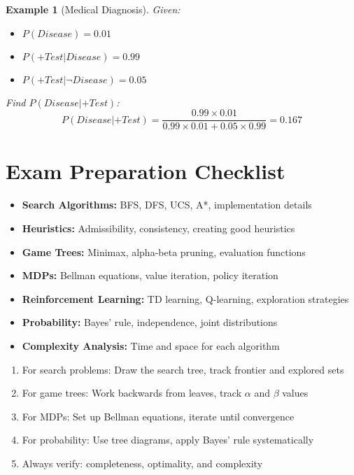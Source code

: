 \documentclass[11pt,letterpaper]{article}
\newtheorem{example}{Example}[section]
\begin{document}
\begin{example}[Medical Diagnosis]
Given:
\begin{itemize}
    \item $P(Disease) = 0.01$
    \item $P(+Test|Disease) = 0.99$
    \item $P(+Test|\neg Disease) = 0.05$
\end{itemize}
Find $P(Disease|+Test)$:
$$P(Disease|+Test) = \frac{0.99 \times 0.01}{0.99 \times 0.01 + 0.05 \times 0.99} = 0.167$$
\end{example}

\section{Exam Preparation Checklist}

\begin{tcolorbox}[colback=yellow!10!white,colframe=yellow!50!black,title=Essential Topics to Review]
\begin{itemize}[leftmargin=*]
    \item[\checkmark] \textbf{Search Algorithms:} BFS, DFS, UCS, A*, implementation details
    \item[\checkmark] \textbf{Heuristics:} Admissibility, consistency, creating good heuristics
    \item[\checkmark] \textbf{Game Trees:} Minimax, alpha-beta pruning, evaluation functions
    \item[\checkmark] \textbf{MDPs:} Bellman equations, value iteration, policy iteration
    \item[\checkmark] \textbf{Reinforcement Learning:} TD learning, Q-learning, exploration strategies
    \item[\checkmark] \textbf{Probability:} Bayes' rule, independence, joint distributions
    \item[\checkmark] \textbf{Complexity Analysis:} Time and space for each algorithm
\end{itemize}
\end{tcolorbox}

\begin{tcolorbox}[colback=green!10!white,colframe=green!50!black,title=Problem-Solving Tips]
\begin{enumerate}[leftmargin=*]
    \item For search problems: Draw the search tree, track frontier and explored sets
    \item For game trees: Work backwards from leaves, track $\alpha$ and $\beta$ values
    \item For MDPs: Set up Bellman equations, iterate until convergence
    \item For probability: Use tree diagrams, apply Bayes' rule systematically
    \item Always verify: completeness, optimality, and complexity
\end{enumerate}
\end{tcolorbox}
\end{document}
